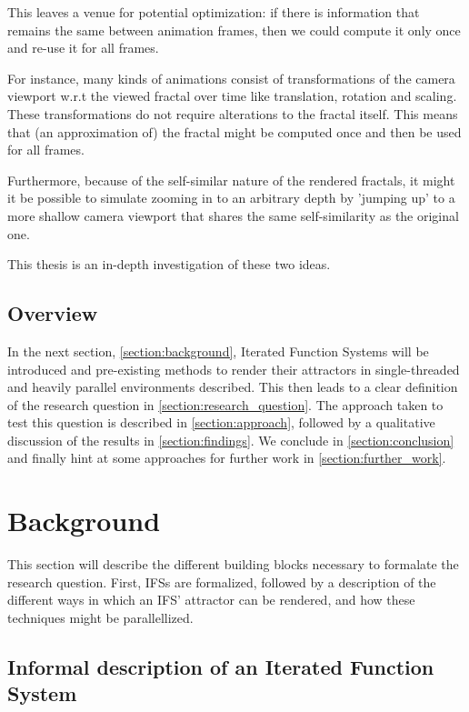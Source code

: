 \documentclass[11pt]{article}
\begin{document}
This leaves a venue for potential optimization: if there is information that remains the same between animation frames, 
then we could compute it only once and re-use it for all frames.

For instance, many kinds of animations consist of transformations of the camera viewport w.r.t the viewed fractal over time like translation, rotation and scaling. 
These transformations do not require alterations to the fractal itself.
This means that (an approximation of) the fractal might be computed once and then be used for all frames.

Furthermore, because of the self-similar nature of the rendered fractals,
it might it be possible to simulate zooming in to an arbitrary depth by 'jumping up' to a more shallow camera viewport
that shares the same self-similarity as the original one.

This thesis is an in-depth investigation of these two ideas.

\subsection{Overview}
\label{sec:org87bdeb7}

In the next section, \autoref{section:background}, Iterated Function Systems will be introduced and pre-existing methods to render their attractors in single-threaded and heavily parallel environments described.
This then leads to a clear definition of the research question in \autoref{section:research_question}.
The approach taken to test this question is described in \autoref{section:approach}, followed by a qualitative discussion of the results in \autoref{section:findings}.
We conclude in \autoref{section:conclusion} and finally hint at some approaches for further work in \autoref{section:further_work}.

\section{Background}
\label{sec:org2a53c12}
\label{section:background}

This section will describe the different building blocks necessary to formalate the research question.
First, IFSs are formalized, followed by a description of the different ways in which an IFS' attractor can be rendered, 
and how these techniques might be parallellized.

\subsection{Informal description of an Iterated Function System}
\label{sec:org7d6652e}
\label{subsection:informal_description}
\end{document}
